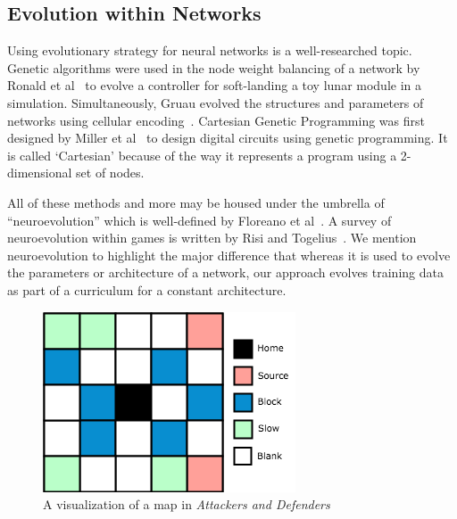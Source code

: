 \documentclass[letterpaper]{article} %
\begin{document}
\subsection{Evolution within Networks}
Using evolutionary strategy for neural networks is a well-researched topic. Genetic algorithms were used in the node weight balancing of a network by Ronald et al~\cite{ronald1994genetic} to evolve a controller for soft-landing a toy lunar module in a simulation. Simultaneously, Gruau evolved the structures and parameters of networks using cellular encoding~\cite{gruau1994neural}. Cartesian Genetic Programming was first designed by Miller et al~\cite{miller1997designing} to design digital circuits using genetic programming. It is called `Cartesian' because of the way it represents a program using a 2-dimensional set of nodes.

All of these methods and more may be housed under the umbrella of ``neuroevolution'' which is well-defined by Floreano et al~\cite{floreano2008neuroevolution}. A survey of neuroevolution within games is written by Risi and Togelius~\cite{risi2017neuroevolution}. We mention neuroevolution to highlight the major difference that whereas it is used to evolve the parameters or architecture of a network, our approach evolves training data as part of a curriculum for a constant architecture.

\begin{figure}
\includegraphics[width=\linewidth]{graphics/map-rep-1.png}
\caption{A visualization of a map in \textit{Attackers and Defenders}}
\label{fig:map-rep}
\end{figure}
\end{document}
